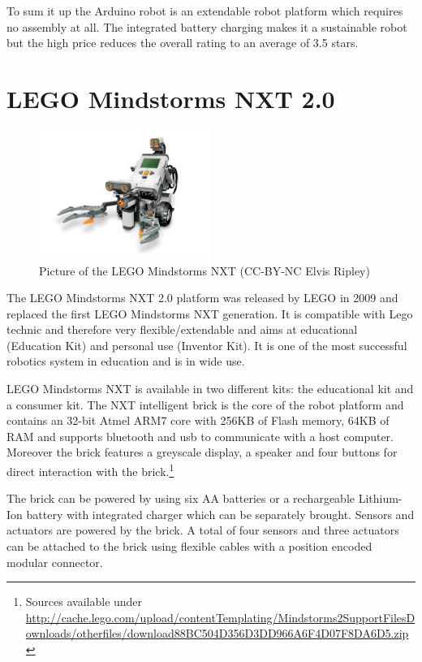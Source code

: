 To sum it up the Arduino robot is an extendable robot platform which requires no assembly at all. The integrated battery charging makes it a sustainable robot but the high price reduces the overall rating to an average of 3.5 stars.

\section{LEGO Mindstorms NXT 2.0}
\begin{figure}[H]
  \centering
  \includegraphics[width=0.5\textwidth]{images/mindstorms.jpg}
  \caption{Picture of the LEGO Mindstorms NXT (CC-BY-NC Elvis Ripley)}
\end{figure}

The LEGO Mindstorms NXT 2.0 platform was released by LEGO in 2009 and replaced the first LEGO Mindstorms NXT generation. It is compatible with Lego technic and therefore very flexible/extendable and aims at educational (Education Kit) and personal use (Inventor Kit). It is one of the most successful robotics system in education and is in wide use.\cite[p. 1]{ranganathan2008use}

LEGO Mindstorms NXT is available in two different kits: the educational kit and a consumer kit. The NXT intelligent brick is the core of the robot platform and contains an 32-bit Atmel ARM7 core with 256KB of Flash memory, 64KB of RAM and supports bluetooth and usb to communicate with a host computer. Moreover the brick features a greyscale display, a speaker and four buttons for direct interaction with the brick.\footnote{Sources available under \url{http://cache.lego.com/upload/contentTemplating/Mindstorms2SupportFilesDownloads/otherfiles/download88BC504D356D3DD966A6F4D07F8DA6D5.zip}}

The brick can be powered by using six AA batteries or a rechargeable Lithium-Ion battery with integrated charger which can be separately brought. Sensors and actuators are powered by the brick. A total of four sensors and three actuators can be attached to the brick using flexible cables with a position encoded modular connector.

